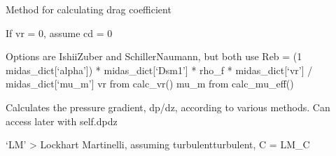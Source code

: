 \documentclass[letterpaper,10pt,english]{sphinxmanual}
\begin{document}
\begin{fulllineitems}
\begin{fulllineitems}
\label{\detokenize{api/MARIGOLD.Condition:MARIGOLD.Condition.calc_cd}}
\pysigstartsignatures
{}
\pysigstopsignatures
\sphinxAtStartPar
Method for calculating drag coefficient

\sphinxAtStartPar
If vr = 0, assume cd = 0

\sphinxAtStartPar
Options are Ishii\sphinxhyphen{}Zuber and Schiller\sphinxhyphen{}Naumann, but both use
Reb = (1 \sphinxhyphen{} midas\_dict{[}‘alpha’{]}) * midas\_dict{[}‘Dsm1’{]} * rho\_f * midas\_dict{[}‘vr’{]} / midas\_dict{[}‘mu\_m’{]}
vr from calc\_vr()
mu\_m from calc\_mu\_eff()

\end{fulllineitems}


\begin{fulllineitems}
\label{\detokenize{api/MARIGOLD.Condition:MARIGOLD.Condition.calc_dpdz}}
\pysigstartsignatures
{}
\pysigstopsignatures
\sphinxAtStartPar
Calculates the pressure gradient, dp/dz, according to various methods. Can access later with self.dpdz

\sphinxAtStartPar
‘LM’ \sphinxhyphen{}\textgreater{} Lockhart Martinelli, assuming turbulent\sphinxhyphen{}turbulent, C = LM\_C

\end{fulllineitems}


\end{fulllineitems}
\end{document}
